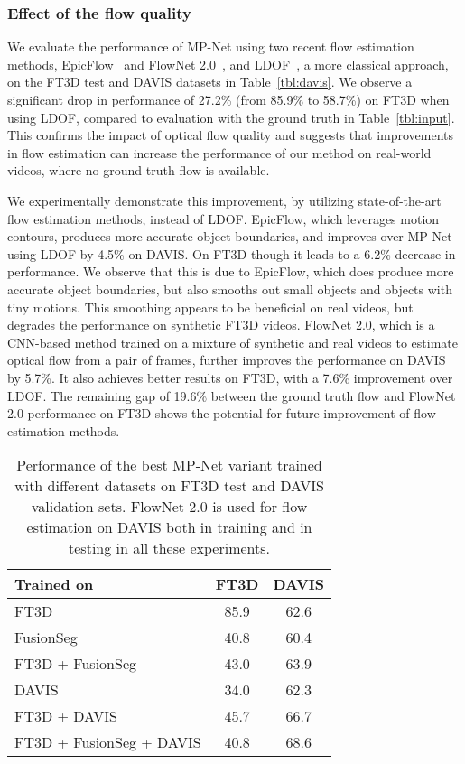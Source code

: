 \subsubsection{Effect of the flow quality}
\label{sec:realvidexp}
We evaluate the performance of MP-Net using two recent flow estimation methods,
EpicFlow~\cite{Revaud15} and FlowNet 2.0~\cite{ilg2016flownet}, and
LDOF~\cite{Brox11a,sundaram2010dense}, a more classical approach, on the FT3D
test and DAVIS datasets in Table~\ref{tbl:davis}. We observe a significant drop
in performance of 27.2\% (from 85.9\% to 58.7\%) on FT3D when using LDOF,
compared to evaluation with the ground truth in Table~\ref{tbl:input}. This
confirms the impact of optical flow quality and suggests that improvements in
flow estimation can increase the performance of our method on real-world
videos, where no ground truth flow is available.

We experimentally demonstrate this improvement, by utilizing state-of-the-art
flow estimation methods, instead of LDOF. EpicFlow, which leverages motion
contours, produces more accurate object boundaries, and improves over MP-Net
using LDOF by 4.5\% on DAVIS. On FT3D though it leads to a 6.2\% decrease in
performance. We observe that this is due to EpicFlow, which does produce more
accurate object boundaries, but also smooths out small objects and objects with
tiny motions.  This smoothing appears to be beneficial on real videos, but
degrades the performance on synthetic FT3D videos. FlowNet 2.0, which is a
CNN-based method trained on a mixture of synthetic and real videos to estimate
optical flow from a pair of frames, further improves the performance on DAVIS
by 5.7\%. It also achieves better results on FT3D, with a 7.6\% improvement
over LDOF. The remaining gap of 19.6\% between the ground truth flow and
FlowNet 2.0 performance on FT3D shows the potential for future improvement of
flow estimation methods.
\begin{table}[t]
\begin{center}
\begin{tabular}{l|c|c}
\hline
Trained on & FT3D & DAVIS \\
\hline
FT3D & 85.9 & 62.6  \\
FusionSeg & 40.8 & 60.4  \\
FT3D + FusionSeg & 43.0 & 63.9  \\
DAVIS & 34.0 & 62.3  \\
FT3D + DAVIS & 45.7 & 66.7  \\
FT3D + FusionSeg + DAVIS & 40.8 & 68.6  \\
\hline
\end{tabular}
\caption{Performance of the best MP-Net variant trained with different datasets
on FT3D test and DAVIS validation sets. FlowNet 2.0 is used for flow estimation
on DAVIS both in training and in testing in all these experiments.}
\label{tbl:fusionseg}
\end{center}
\end{table}

